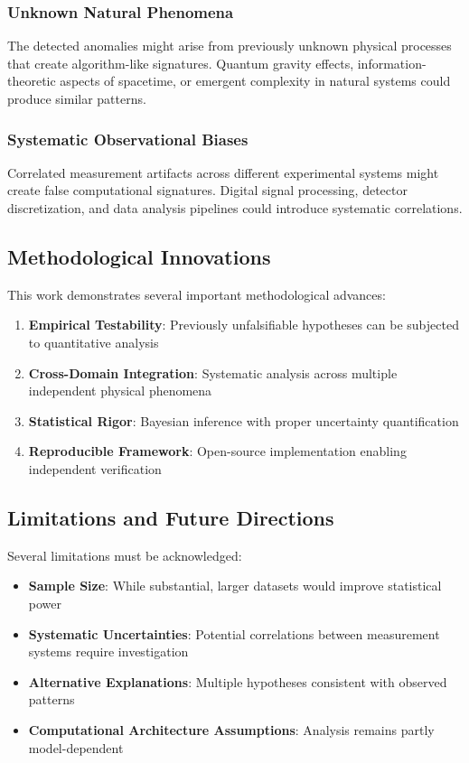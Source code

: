 \documentclass[12pt,a4paper]{article}
\begin{document}
\subsubsection{Unknown Natural Phenomena}
The detected anomalies might arise from previously unknown physical processes that create algorithm-like signatures. Quantum gravity effects, information-theoretic aspects of spacetime, or emergent complexity in natural systems could produce similar patterns.

\subsubsection{Systematic Observational Biases}
Correlated measurement artifacts across different experimental systems might create false computational signatures. Digital signal processing, detector discretization, and data analysis pipelines could introduce systematic correlations.

\subsection{Methodological Innovations}

This work demonstrates several important methodological advances:

\begin{enumerate}
\item \textbf{Empirical Testability}: Previously unfalsifiable hypotheses can be subjected to quantitative analysis
\item \textbf{Cross-Domain Integration}: Systematic analysis across multiple independent physical phenomena
\item \textbf{Statistical Rigor}: Bayesian inference with proper uncertainty quantification
\item \textbf{Reproducible Framework}: Open-source implementation enabling independent verification
\end{enumerate}

\subsection{Limitations and Future Directions}

Several limitations must be acknowledged:

\begin{itemize}
\item \textbf{Sample Size}: While substantial, larger datasets would improve statistical power
\item \textbf{Systematic Uncertainties}: Potential correlations between measurement systems require investigation
\item \textbf{Alternative Explanations}: Multiple hypotheses consistent with observed patterns
\item \textbf{Computational Architecture Assumptions}: Analysis remains partly model-dependent
\end{itemize}
\end{document}
